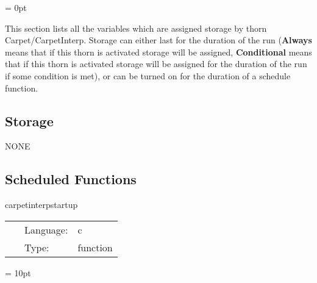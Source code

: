 \parskip = 0pt


\noindent This section lists all the variables which are assigned storage by thorn Carpet/CarpetInterp.  Storage can either last for the duration of the run ({\bf Always} means that if this thorn is activated storage will be assigned, {\bf Conditional} means that if this thorn is activated storage will be assigned for the duration of the run if some condition is met), or can be turned on for the duration of a schedule function.


\subsection*{Storage}NONE
\subsection*{Scheduled Functions}
\vspace{5mm}


\hspace{5mm} carpetinterpstartup 

\hspace{5mm}{\it startup routine } 


\hspace{5mm}

 \begin{tabular*}{160mm}{cll} 
~ & Language:  & c \\ 
~ & Type:  & function \\ 
\end{tabular*} 



\vspace{5mm}\parskip = 10pt 

